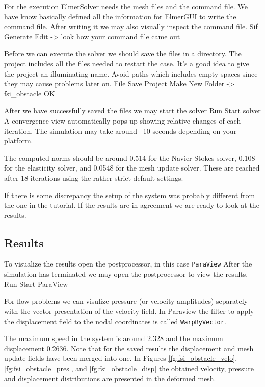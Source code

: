 For the execution 
ElmerSolver needs the mesh files and the command file. We have know basically defined
all the information for ElmerGUI to write the command file. After writing it we may also visually 
inspect the command file.
\ttbegin
Sif 
  Generate
  Edit -> look how your command file came out  
\ttend

Before we can execute the solver we should save the files in a directory. The project includes
all the files needed to restart the case. It's a good idea to give the project an illuminating name.
Avoid paths which includes empty spaces since they may cause problems later on. 
\ttbegin
File 
  Save Project
    Make New Folder -> fsi_obstacle
    OK
\ttend

After we have successfully saved the files we may start the solver
\ttbegin
Run
  Start solver
\ttend
A convergence view automatically pops up showing relative changes of each iteration.
The simulation may take around ~10 seconds depending on your platform. 

The computed norms should be around 0.514 for the Navier-Stokes solver, 0.108 for the elasticity solver,
and 0.0548 for the mesh update solver. These are reached after 18 iterations using the rather strict default settings.

If there is some discrepancy the setup of the system
was probably different from the one in the tutorial.
If the results are in agreement we are ready to look at the results.

\subsection*{Results}

To visualize the results open the postprocessor, in this case \texttt{ParaView}
After the simulation has terminated we may open the postprocessor to view the results.
\ttbegin
Run
  Start ParaView
\ttend

For flow problems we can visulize pressure (or velocity amplitudes) separately with the vector presentation
of the velocity field. In Paraview the filter to apply the displacement field to the nodal coordinates is
called \texttt{WarpByVector}.

The maximum speed in the system is around 2.328 and the maximum displacement 0.2636. Note that 
for the saved results the displacement and mesh update fields have been merged into one. 
In Figures \ref{fg:fsi_obstacle_velo}, \ref{fg:fsi_obstacle_pres}, and
\ref{fg:fsi_obstacle_disp}
the obtained velocity, pressure and displacement 
distributions are presented in the deformed mesh.
 
